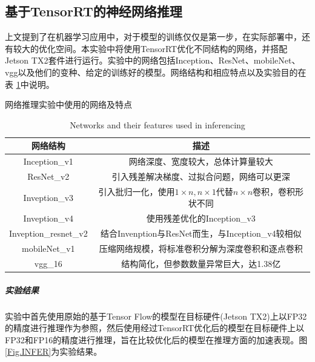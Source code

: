\subsection{基于TensorRT的神经网络推理}
\par 上文提到了在机器学习应用中，对于模型的训练仅仅是第一步，在实际部署中，还有较大的优化空间。本实验中将使用TensorRT优化不同结构的网络，并搭配Jetson TX2套件进行运行。实验中的网络包括Inception、ResNet、mobileNet、vgg以及他们的变种、给定的训练好的模型。网络结构和相应特点以及实验目的在表 \ref{table-NETWORKS}中说明。
\begin{table}
	\centering
	\renewcommand{\thetable}{\arabic{section}-\arabic{table} }
	\renewcommand{\tablename}{表}
	\caption{网络推理实验中使用的网络及特点}
	\addtocounter{table}{-1}
	\renewcommand{\thetable}{\arabic{section}-\arabic{table} }
	\renewcommand{\tablename}{Table}
	\caption{Networks and their features used in inferencing}
	\begin{tabular}{cc}
		\toprule
		网络结构	&	描述\\
		\midrule
		Inception\_v1 & 网络深度、宽度较大，总体计算量较大\\
		ResNet\_v2 & 引入残差解决梯度、过拟合问题，网络可以更深\\
		Inveption\_v3 & 引入批归一化，使用$ 1\times n, n\times 1 $代替$ n\times n $卷积，卷积形状不同\\
		Inveption\_v4 & 使用残差优化的Inception\_v3\\
		Inveption\_resnet\_v2 & 结合Invenption与ResNet而生，与Inception\_v4较相似\\
		mobileNet\_v1 & 压缩网络规模，将标准卷积分解为深度卷积和逐点卷积\\
		vgg\_16 &  结构简化，但参数数量异常巨大，达1.38亿\\
		\bottomrule
	\end{tabular} \label{table-NETWORKS} 
\end{table}
\subparagraph{实验结果}
\par 实验中首先使用原始的基于Tensor Flow的模型在目标硬件(Jetson TX2)上以FP32的精度进行推理作为参照，然后使用经过TensorRT优化后的模型在目标硬件上以FP32和FP16的精度进行推理，旨在比较优化后的模型在推理方面的加速表现。图 \ref{Fig.INFER}为实验结果。
